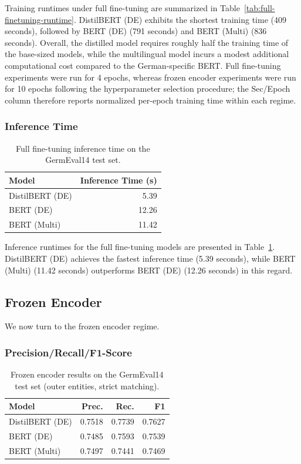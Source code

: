 \documentclass[11pt,a4paper,twocolumn]{article}
\begin{document}
Training runtimes under full fine-tuning are summarized in Table~\ref{tab:full-finetuning-runtime}.
DistilBERT (DE) exhibits the shortest training time (409 seconds), followed by BERT (DE) (791 seconds) and BERT (Multi) (836 seconds).
Overall, the distilled model requires roughly half the training time of the base-sized models, while the multilingual model incurs a modest additional computational cost compared to the German-specific BERT.
Full fine-tuning experiments were run for 4 epochs, whereas frozen encoder experiments were run for 10 epochs following the hyperparameter selection procedure; the Sec/Epoch column therefore reports normalized per-epoch training time within each regime.

\subsubsection{Inference Time}
\begin{table}[h]
    \centering
    \begin{tabular}{lr}
        \toprule
        \textbf{Model} & \textbf{Inference Time (s)} \\
        \midrule
        DistilBERT (DE) & 5.39 \\
        BERT (DE) & 12.26 \\
        BERT (Multi) & 11.42 \\
        \bottomrule
    \end{tabular}
    \caption{Full fine-tuning inference time on the GermEval14 test set.}
    \label{tab:full-finetuning-inference}
\end{table}
Inference runtimes for the full fine-tuning models are presented in Table~\ref{tab:full-finetuning-inference}.
DistilBERT (DE) achieves the fastest inference time (5.39 seconds), while BERT (Multi) (11.42 seconds) outperforms BERT (DE) (12.26 seconds) in this regard. 
\subsection{Frozen Encoder}
\FloatBarrier
We now turn to the frozen encoder regime.
\subsubsection{Precision/Recall/F1-Score}
\begin{table}[h]
    \centering
    \begin{tabular}{lrrr}
        \toprule
        \textbf{Model} & \textbf{Prec.} & \textbf{Rec.} & \textbf{F1} \\
        \midrule
        DistilBERT (DE) & 0.7518 & 0.7739 & 0.7627 \\
        BERT (DE) & 0.7485 & 0.7593 & 0.7539 \\
        BERT (Multi) & 0.7497 & 0.7441 & 0.7469 \\
        \bottomrule
    \end{tabular}
    \caption{Frozen encoder results on the GermEval14 test set (outer entities, strict matching).}
    \label{tab:frozen-encoder-results}
\end{table}
\end{document}

